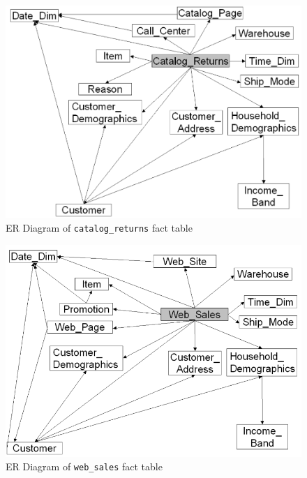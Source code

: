 \documentclass[conference]{IEEEtran}
\begin{document}
\begin{figure}[htbp]
    \centering
    \includegraphics[width=\linewidth]{figures/fact_table_catalog_returns.png}
    \caption{ER Diagram of \texttt{catalog\_returns} fact table }
    \label{fig:catalog_returns}
\end{figure}

\begin{figure}[htbp]
    \centering
    \includegraphics[width=\linewidth]{figures/fact_table_web_sales.png}
    \caption{ER Diagram of \texttt{web\_sales} fact table }
    \label{fig:web_sales}
\end{figure}
\end{document}
